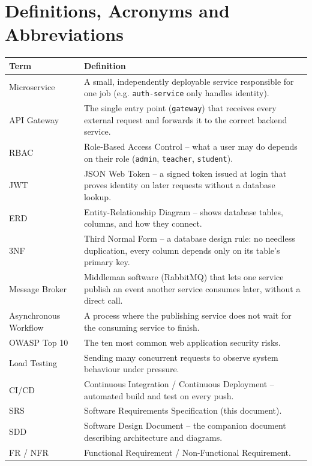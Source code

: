 \documentclass[11pt,a4paper]{report}
\begin{document}
\section{Definitions, Acronyms and Abbreviations}
\begin{longtable}{L{3.3cm} L{10.7cm}}
\toprule
\textbf{Term} & \textbf{Definition} \\
\midrule
\endhead
Microservice & A small, independently deployable service responsible for one job (e.g. \texttt{auth-service} only handles identity). \\
API Gateway & The single entry point (\texttt{gateway}) that receives every external request and forwards it to the correct backend service. \\
RBAC & Role-Based Access Control -- what a user may do depends on their role (\texttt{admin}, \texttt{teacher}, \texttt{student}). \\
JWT & JSON Web Token -- a signed token issued at login that proves identity on later requests without a database lookup. \\
ERD & Entity-Relationship Diagram -- shows database tables, columns, and how they connect. \\
3NF & Third Normal Form -- a database design rule: no needless duplication, every column depends only on its table's primary key. \\
Message Broker & Middleman software (RabbitMQ) that lets one service publish an event another service consumes later, without a direct call. \\
Asynchronous Workflow & A process where the publishing service does not wait for the consuming service to finish. \\
OWASP Top 10 & The ten most common web application security risks. \\
Load Testing & Sending many concurrent requests to observe system behaviour under pressure. \\
CI/CD & Continuous Integration / Continuous Deployment -- automated build and test on every push. \\
SRS & Software Requirements Specification (this document). \\
SDD & Software Design Document -- the companion document describing architecture and diagrams. \\
FR / NFR & Functional Requirement / Non-Functional Requirement. \\
\bottomrule
\end{longtable}
\end{document}
